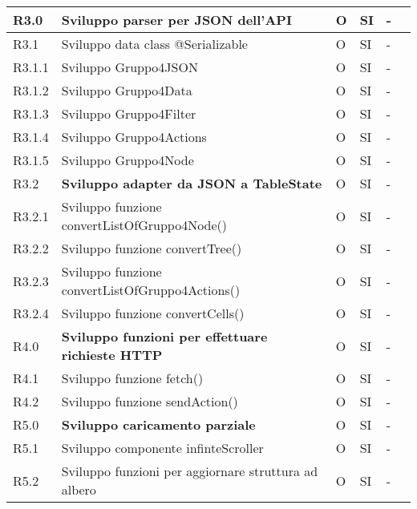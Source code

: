 \begin{longtable} {
		|>{}p{10mm}| 
		|>{}p{60mm}|
		|>{}p{15mm}|
		|>{}p{15mm}|
		|>{}p{15mm}|
		>{}p{0mm}}
	R3.0   & \textbf{Sviluppo parser per JSON dell'API}         & O & SI & -     \\ \hline
	R3.1   & Sviluppo data class @Serializable 	   & O & SI & -     \\ \hline
	R3.1.1 & Sviluppo Gruppo4JSON & O & SI & - \\ \hline
	R3.1.2 & Sviluppo Gruppo4Data & O & SI & - \\ \hline
	R3.1.3 & Sviluppo Gruppo4Filter & O & SI & - \\ \hline
	R3.1.4 & Sviluppo Gruppo4Actions & O & SI & - \\ \hline
	R3.1.5 & Sviluppo Gruppo4Node & O & SI & - \\ \hline
	R3.2   & \textbf{Sviluppo adapter da JSON a TableState} & O & SI & -     \\ \hline
	R3.2.1   & Sviluppo funzione convertListOfGruppo4Node() & O & SI & -     \\ \hline
	R3.2.2   & Sviluppo funzione convertTree() & O & SI & -     \\ \hline
	R3.2.3   & Sviluppo funzione convertListOfGruppo4Actions() & O & SI & -     \\ \hline
	R3.2.4   & Sviluppo funzione convertCells() & O & SI & -     \\ \hline
	
	R4.0 & \textbf{Sviluppo funzioni per effettuare richieste HTTP}  & O & SI & -     \\ \hline
	R4.1   & Sviluppo funzione fetch() & O & SI & -     \\ \hline
	R4.2   & Sviluppo funzione sendAction() & O & SI & -     \\ \hline
	
	R5.0 & \textbf{Sviluppo caricamento parziale}  & O & SI & -     \\ \hline
	R5.1   & Sviluppo componente infinteScroller & O & SI & -     \\ \hline
	R5.2   & Sviluppo funzioni per aggiornare struttura ad albero & O & SI & -     \\ \hline
	\hline
\end{longtable}